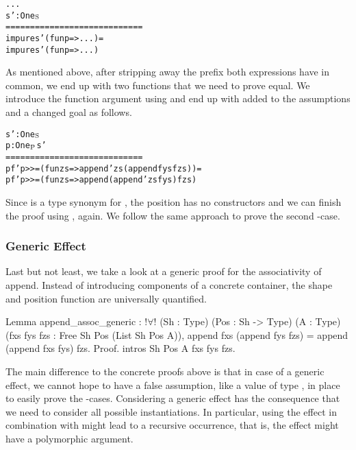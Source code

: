 \begin{alltt}
  ...
  s' : One\(\sb{\text{S}}\)
  ============================
  impure s' (fun p => ...) =
  impure s' (fun p => ...)
\end{alltt}

As mentioned above, after stripping away the prefix both expressions have in common, we end up with two functions that we need to prove equal.
We introduce the function argument  using  and end up with  added to the assumptions and a changed goal as follows.

\begin{alltt}
  s' : One\(\sb{\text{S}}\)
  p : One\(\sb{\text{P}}\) s'
  ============================
  pf' p >>= (fun zs => append' zs (append fys fzs)) =
  pf' p >>= (fun zs => append (append' zs fys) fzs)
\end{alltt}

Since  is a type synonym for , the position  has no constructors and we can finish the proof using , again.
We follow the same approach to prove the second \--case.

\subsubsection{Generic Effect}
Last but not least, we take a look at a generic proof for the associativity of append. Instead of introducing components of a concrete container, the shape  and position function  are universally quantified.

\begin{coqcode}
Lemma append_assoc_generic :
  !$\forall$! (Sh : Type) (Pos : Sh -> Type) (A : Type)
    (fxs fys fzs : Free Sh Pos (List Sh Pos A)),
    append fxs (append fys fzs) = append (append fxs fys) fzs.
Proof.
intros Sh Pos A fxs fys fzs.
\end{coqcode}

The main difference to the concrete proofs above is that in case of a generic effect, we cannot hope to have a false assumption, like a value of type , in place to easily prove the \--cases.
Considering a generic effect has the consequence that we need to consider all possible instantiations.
In particular, using the effect in combination with  might lead to a recursive occurrence, that is, the effect might have a polymorphic argument.

